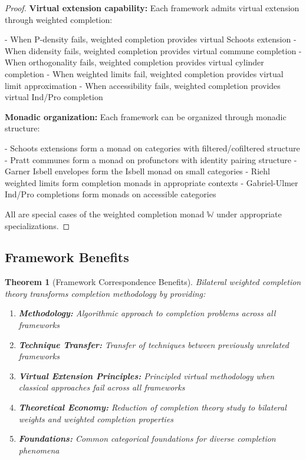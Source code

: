 \documentclass[11pt]{article}
\theoremstyle{plain}
\newtheorem{theorem}{Theorem}[section]
\theoremstyle{definition}
\theoremstyle{remark}
\begin{document}
\begin{proof}
\textbf{Virtual extension capability:} Each framework admits virtual extension through weighted completion:

- When P-density fails, weighted completion provides virtual Schoots extension
- When didensity fails, weighted completion provides virtual commune completion
- When orthogonality fails, weighted completion provides virtual cylinder completion
- When weighted limits fail, weighted completion provides virtual limit approximation
- When accessibility fails, weighted completion provides virtual Ind/Pro completion

\textbf{Monadic organization:} Each framework can be organized through monadic structure:

- Schoots extensions form a monad on categories with filtered/cofiltered structure
- Pratt communes form a monad on profunctors with identity pairing structure
- Garner Isbell envelopes form the Isbell monad on small categories
- Riehl weighted limits form completion monads in appropriate contexts
- Gabriel-Ulmer Ind/Pro completions form monads on accessible categories

All are special cases of the weighted completion monad $\mathbb{W}$ under appropriate specializations.
\end{proof}

\subsection{Framework Benefits}

\begin{theorem}[Framework Correspondence Benefits]\label{thm:unification-benefits}
Bilateral weighted completion theory transforms completion methodology by providing:

\begin{enumerate}
\item \textbf{Methodology:} Algorithmic approach to completion problems across all frameworks

\item \textbf{Technique Transfer:} Transfer of techniques between previously unrelated frameworks

\item \textbf{Virtual Extension Principles:} Principled virtual methodology when classical approaches fail across all frameworks

\item \textbf{Theoretical Economy:} Reduction of completion theory study to bilateral weights and weighted completion properties

\item \textbf{Foundations:} Common categorical foundations for diverse completion phenomena
\end{enumerate}
\end{theorem}
\end{document}
